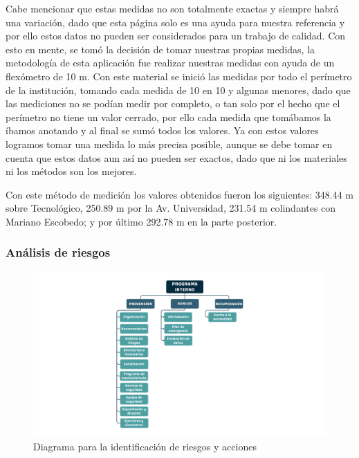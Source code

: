     Cabe mencionar que estas medidas no son totalmente exactas y siempre habrá una variación, dado que esta página solo es una ayuda para nuestra referencia y por ello estos datos no pueden ser considerados para un trabajo de calidad. Con esto en mente, se tomó la decisión de tomar nuestras propias medidas, la metodología de esta aplicación fue realizar nuestras medidas con ayuda de un flexómetro de 10 m. Con este material se inició las medidas por todo el perímetro de la institución, tomando cada medida de 10 en 10 y algunas menores, dado que las mediciones no se podían medir por completo, o tan solo por el hecho que el perímetro no tiene un valor cerrado, por ello cada medida que tomábamos la íbamos anotando y al final se sumó todos los valores. Ya con estos valores logramos tomar una medida lo más precisa posible, aunque se debe tomar en cuenta que estos datos aun así no pueden ser exactos, dado que ni los materiales ni los métodos son los mejores.
    
    Con este método de medición los valores obtenidos fueron los siguientes: 348.44 m sobre Tecnológico, 250.89 m por la Av. Universidad, 231.54 m  colindantes con Mariano Escobedo; y por último 292.78 m en la parte posterior.
    
    \subsubsection{Análisis de riesgos}
    
    \begin{figure}[H] 
        \centering
        \includegraphics[trim = {140mm 15mm 140mm 15mm},clip,scale=0.4]{22/Img/programaInterno.pdf}
        \caption{Diagrama para la identificación de riesgos y acciones}
        \label{fig:dig}
    \end{figure}
    
